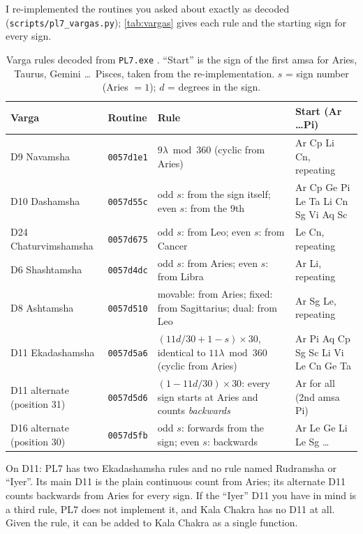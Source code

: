 I re-implemented the routines you asked about exactly as decoded
(\texttt{scripts/pl7\_vargas.py}); \autoref{tab:vargas} gives each rule and the starting
sign for every sign.

\begin{table}[htbp]
  \centering
  \small
  \caption[Decoded varga rules]{Varga rules decoded from \texttt{PL7.exe} \tagBIN.
  ``Start'' is the sign of the first amsa for Aries, Taurus, Gemini \ldots\ Pisces, taken
  from the re-implementation. $s$ = sign number (Aries $=1$); $d$ = degrees in the sign.}
  \label{tab:vargas}
  \begin{tabularx}{\textwidth}{>{\raggedright\arraybackslash}p{2.5cm} l >{\raggedright\arraybackslash}X >{\raggedright\arraybackslash}p{3.7cm}}
    \toprule
    Varga & Routine & Rule & Start (Ar \ldots Pi) \\
    \midrule
    D9 Navamsha & \texttt{0057d1e1} & $9\lambda \bmod 360$ (cyclic from Aries) & Ar Cp Li Cn, repeating \\
    D10 Dashamsha & \texttt{0057d55c} & odd $s$: from the sign itself; even $s$: from the 9th & Ar Cp Ge Pi Le Ta Li Cn Sg Vi Aq Sc \\
    D24 Chatur\-vimshamsha & \texttt{0057d675} & odd $s$: from Leo; even $s$: from Cancer & Le Cn, repeating \\
    D6 Shashtamsha & \texttt{0057d4dc} & odd $s$: from Aries; even $s$: from Libra & Ar Li, repeating \\
    D8 Ashtamsha & \texttt{0057d510} & movable: from Aries; fixed: from Sagittarius; dual: from Leo & Ar Sg Le, repeating \\
    D11 Ekadashamsha & \texttt{0057d5a6} & $(11d/30 + 1 - s)\times 30$, identical to $11\lambda \bmod 360$ (cyclic from Aries) & Ar Pi Aq Cp Sg Sc Li Vi Le Cn Ge Ta \\
    D11 alternate (position 31) & \texttt{0057d5d6} & $(1 - 11d/30)\times 30$: every sign starts at Aries and counts \emph{backwards} & Ar for all (2nd amsa Pi) \\
    D16 alternate (position 30) & \texttt{0057d5fb} & odd $s$: forwards from the sign; even $s$: backwards & Ar Le Ge Li Le Sg \ldots \\
    \bottomrule
  \end{tabularx}
\end{table}

\begin{notebox}\ksimple On D11: PL7 has two Ekadashamsha rules and no rule named
Rudramsha or ``Iyer''. Its main D11 is the plain continuous count from Aries; its alternate
D11 counts backwards from Aries for every sign. If the ``Iyer'' D11 you have in mind is a
third rule, PL7 does not implement it, and Kala Chakra has no D11 at all. Given the rule,
it can be added to Kala Chakra as a single function.\end{notebox}

